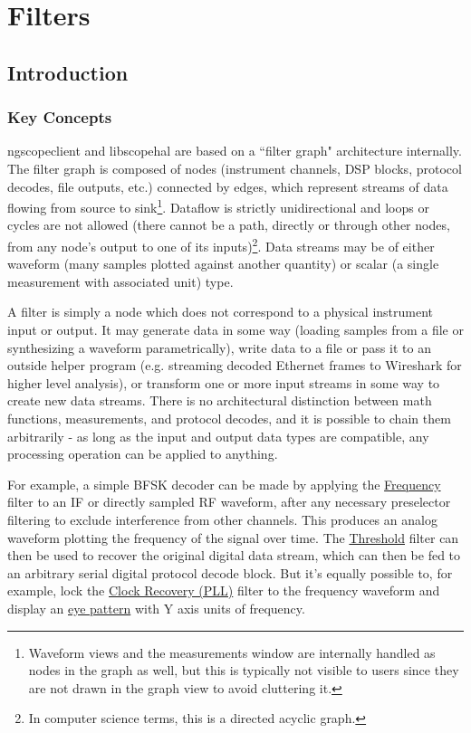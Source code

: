 \chapter{Filters}

\section{Introduction}

\subsection{Key Concepts}

ngscopeclient and libscopehal are based on a ``filter graph" architecture internally. The filter graph is composed of
nodes (instrument channels, DSP blocks, protocol decodes, file outputs, etc.) connected by edges, which represent
streams of data flowing from source to sink\footnote{Waveform views and the measurements window are internally handled
as nodes in the graph as well, but this is typically not visible to users since they are not drawn in the graph view to
avoid cluttering it.}. Dataflow is strictly unidirectional and loops or cycles are not allowed (there cannot be a path,
directly or through other nodes, from any node's output to one of its inputs)\footnote{In computer science terms, this
is a directed acyclic graph.}. Data streams may be of either waveform (many samples plotted against another quantity)
or scalar (a single measurement with associated unit) type.

A filter is simply a node which does not correspond to a physical instrument input or output. It may generate data in
some way (loading samples from a file or synthesizing a waveform parametrically), write data to a file or pass it to an
outside helper program (e.g. streaming decoded Ethernet frames to Wireshark for higher level analysis), or transform
one or more input streams in some way to create new data streams. There is no architectural distinction between math
functions, measurements, and protocol decodes, and it is possible to chain them arbitrarily - as long as the input and
output data types are compatible, any processing operation can be applied to anything.

For example, a simple BFSK decoder can be made by applying the \hyperref[filter:frequency]{Frequency} filter to an IF
or directly sampled RF waveform, after any necessary preselector filtering to exclude interference from other channels.
This produces an analog waveform plotting the frequency of the signal over time. The
\hyperref[filter:threshold]{Threshold} filter can then be used to recover the original digital data stream, which can
then be fed to an arbitrary serial digital protocol decode block. But it's equally possible to, for example, lock the
\hyperref[filter:cdrpll]{Clock Recovery (PLL)} filter to the frequency waveform and display an
\hyperref[filter:eyepattern]{eye pattern} with Y axis units of frequency.

